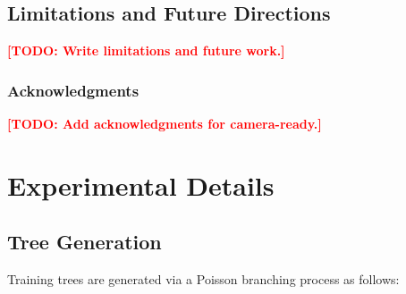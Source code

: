 \documentclass{article}
\theoremstyle{definition}
\theoremstyle{plain}
\newcommand{\TODO}[1]{\textcolor{red}{\textbf{[TODO: #1]}}}
\begin{document}
\subsection{Limitations and Future Directions}
\label{sec:discussion:limitations}

\TODO{Write limitations and future work.}


\subsubsection*{Acknowledgments}
\TODO{Add acknowledgments for camera-ready.}





\appendix

\section{Experimental Details}
\label{app:details}

\subsection*{Tree Generation}
\label{app:tree-gen}

Training trees are generated via a Poisson branching process as follows:
\end{document}
